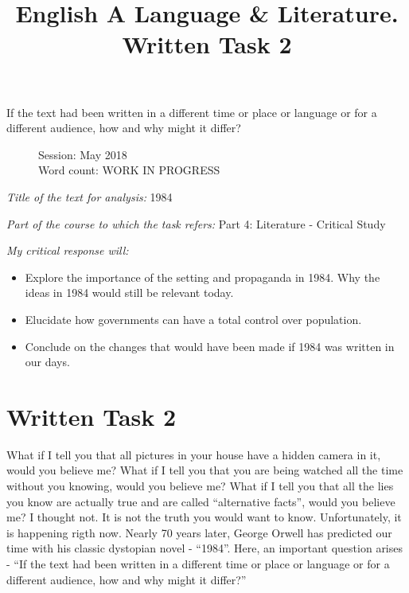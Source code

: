\documentclass[a4paper,12pt]{article}
\title{English A Language \& Literature. Written Task 2}
\date{}
\author{}
\begin{document}
\maketitle
\begin{center}
If the text had been written in a different time or place or language or for a different audience, how and why might it differ?
\end{center}
\begin{flushleft}
\begin{figure}
Session: May 2018\\
Word count: WORK IN PROGRESS\\
\end{figure}
\end{flushleft}
\newpage
\singlespacing
\textit{Title of the text for analysis:} 1984

\textit{Part of the course to which the task refers:} Part 4: Literature - Critical Study 

\textit{My critical response will:}

\begin{itemize}

\item Explore the importance of the setting and propaganda in 1984. Why the ideas in 1984 would still be relevant today.

  \item Elucidate how governments can have a total control over population.

  \item Conclude on the changes that would have been made if 1984 was written in our days.
    
  \end{itemize}
\doublespacing
\section*{Written Task 2}

What if I tell you that all pictures in your house have a hidden camera in it, would you believe me?
What if I tell you that you are being watched all the time without you knowing, would you believe me?
What if I tell you that all the lies you know are actually true and are called ``alternative facts'', would you believe me?
I thought not.
It is not the truth you would want to know.
Unfortunately, it is happening rigth now. Nearly 70 years later, George Orwell has predicted our time with his classic dystopian novel - ``1984''.
Here, an important question arises - ``If the text had been written in a different time or place or language or for a different audience, how and why might it differ?'' \\
\end{document}
